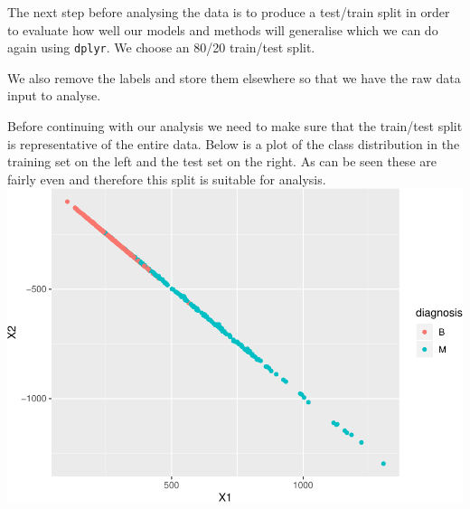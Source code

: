 \documentclass[]{article}
\newenvironment{Shaded}{\begin{snugshade}}{\end{snugshade}}
\newcommand{\KeywordTok}[1]{\textcolor[rgb]{0.13,0.29,0.53}{\textbf{#1}}}
\newcommand{\DataTypeTok}[1]{\textcolor[rgb]{0.13,0.29,0.53}{#1}}
\newcommand{\FloatTok}[1]{\textcolor[rgb]{0.00,0.00,0.81}{#1}}
\newcommand{\StringTok}[1]{\textcolor[rgb]{0.31,0.60,0.02}{#1}}
\newcommand{\OperatorTok}[1]{\textcolor[rgb]{0.81,0.36,0.00}{\textbf{#1}}}
\newcommand{\NormalTok}[1]{#1}
\begin{document}
The next step before analysing the data is to produce a test/train split
in order to evaluate how well our models and methods will generalise
which we can do again using \texttt{dplyr}. We choose an 80/20
train/test split.

\begin{Shaded}
\end{Shaded}

We also remove the labels and store them elsewhere so that we have the
raw data input to analyse.

\begin{Shaded}
\end{Shaded}

Before continuing with our analysis we need to make sure that the
train/test split is representative of the entire data. Below is a plot
of the class distribution in the training set on the left and the test
set on the right. As can be seen these are fairly even and therefore
this split is suitable for analysis.
\includegraphics{final_submission_files/figure-latex/unnamed-chunk-11-1.pdf}
\end{document}
